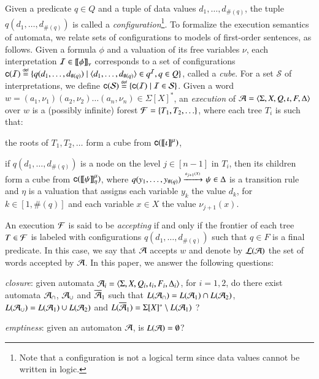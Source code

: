 \documentclass{llncs}
\begin{document}
Given a predicate $q \in Q$ and a tuple of data values
$d_1,\ldots,d_{\#(q)}$, the tuple $q(d_1,\ldots,d_{\#(q)})$ is called
a \emph{configuration}\footnote{Note that a configuration is not a
  logical term since data values cannot be written in logic.}. To
formalize the execution semantics of automata, we relate sets of
configurations to models of first-order sentences, as follows. Given a
formula $\phi$ and a valuation of its free variables $\nu$, each
interpretation $\mathcal{I} \in {\bf [\![} \phi {\bf ]\!]}_\nu$ corresponds to a set of
configurations $\mathsf{c}({\mathcal{I}}) \stackrel{\scriptscriptstyle{\mathsf{def}}}{=} \{ q(d_1,\ldots,d_{\#(q)}) \mid
  \langle d_1,\ldots,d_{\#(q)} \rangle \in q^{\mathcal{I}}, q \in Q \}$, called a
\emph{cube}. For a set $\mathcal{S}$ of interpretations, we define
$\mathsf{c}({\mathcal{S}}) \stackrel{\scriptscriptstyle{\mathsf{def}}}{=} \{ \mathsf{c}({\mathcal{I}}) \mid \mathcal{I} \in
  \mathcal{S} \}$. Given a word $w=(a_1,\nu_1)(a_2,\nu_2) \ldots
(a_n,\nu_n) \in \Sigma[X]^*$, an \emph{execution} of
$\mathcal{A}=\langle \Sigma,X,Q,\iota,F,\Delta \rangle$ over $w$ is a (possibly
infinite) forest $\mathcal{F} = \{ T_1,T_2,\ldots \}$, where each tree $T_i$ is
such that:
\begin{compactitem}
\item the roots of $T_1, T_2, \ldots$ form a cube from
  $\mathsf{c}({{\bf [\![} \iota {\bf ]\!]}^\mu})$, %
%
%
\item if $q(d_1,\ldots,d_{\#(q)})$ is a node on the level $j \in
  [n-1]$ in $T_i$, then its children form a cube from
  $\mathsf{c}({{\bf [\![} \psi {\bf ]\!]}^\mu_\eta})$, where \(q(y_1,\ldots,y_{\#(q)})
  \xrightarrow{{\scriptscriptstyle a_{j+1}(X)}}_{{\scriptstyle }} \psi \in \Delta\) is a transition rule and
  $\eta$ is a valuation that assigns each variable $y_k$ the value
  $d_k$, for $k \in [1,\#(q)]$ and each variable $x \in X$ the value
  $\nu_{j+1}(x)$. %
\end{compactitem}
An execution $\mathcal{F}$ is said to be \emph{accepting} if and only if the
frontier of each tree $T \in \mathcal{F}$ is labeled with configurations
$q(d_1,\ldots,d_{\#(q)})$ such that $q \in F$ is a final predicate. In
this case, we say that $\mathcal{A}$ accepts $w$ and denote by ${\mathcal L}({\mathcal{A}})$ the
set of words accepted by $\mathcal{A}$. In this paper, we answer the following
questions: \begin{compactenum}
\item \emph{closure}: given automata $\mathcal{A}_i =
  \langle \Sigma,X,Q_i,\iota_i,F_i,\Delta_i \rangle$, for $i=1,2$, do there
  exist automata $\mathcal{A}_\cap$, $\mathcal{A}_\cup$ and $\overline{\mathcal{A}}_1$ such that
  $L(\mathcal{A}_\cap) = L(\mathcal{A}_1) \cap L(\mathcal{A}_2)$, $L(\mathcal{A}_\cup) = L(\mathcal{A}_1) \cup
  L(\mathcal{A}_2)$ and $L(\overline{\mathcal{A}}_1) = \Sigma[X]^* \setminus L(\mathcal{A}_1)$ ?
%
\item \emph{emptiness}: given an automaton $\mathcal{A}$, is $L(\mathcal{A}) =
  \emptyset$?
\end{compactenum}
\end{document}
